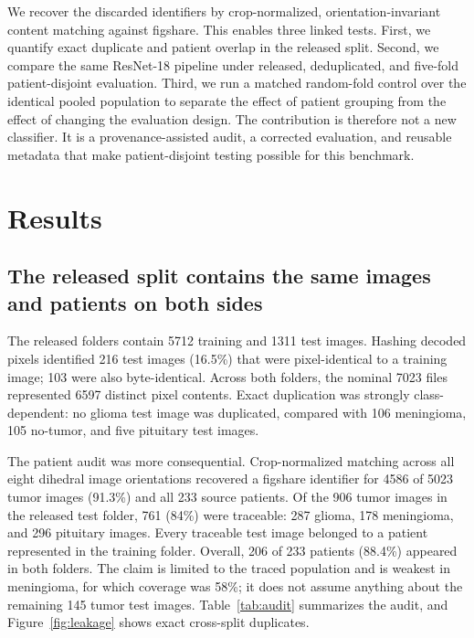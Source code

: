 ﻿\documentclass[twocolumn]{article}
\begin{document}
We recover the discarded identifiers by crop-normalized, orientation-invariant content matching against figshare. This enables three linked tests. First, we quantify exact duplicate and patient overlap in the released split. Second, we compare the same ResNet-18 pipeline under released, deduplicated, and five-fold patient-disjoint evaluation. Third, we run a matched random-fold control over the identical pooled population to separate the effect of patient grouping from the effect of changing the evaluation design. The contribution is therefore not a new classifier. It is a provenance-assisted audit, a corrected evaluation, and reusable metadata that make patient-disjoint testing possible for this benchmark.

\section{Results}
\subsection{The released split contains the same images and patients on both sides}
The released folders contain 5712 training and 1311 test images. Hashing decoded pixels identified 216 test images (16.5\%) that were pixel-identical to a training image; 103 were also byte-identical. Across both folders, the nominal 7023 files represented 6597 distinct pixel contents. Exact duplication was strongly class-dependent: no glioma test image was duplicated, compared with 106 meningioma, 105 no-tumor, and five pituitary test images.

The patient audit was more consequential. Crop-normalized matching across all eight dihedral image orientations recovered a figshare identifier for 4586 of 5023 tumor images (91.3\%) and all 233 source patients. Of the 906 tumor images in the released test folder, 761 (84\%) were traceable: 287 glioma, 178 meningioma, and 296 pituitary images. Every traceable test image belonged to a patient represented in the training folder. Overall, 206 of 233 patients (88.4\%) appeared in both folders. The claim is limited to the traced population and is weakest in meningioma, for which coverage was 58\%; it does not assume anything about the remaining 145 tumor test images. Table~\ref{tab:audit} summarizes the audit, and Figure~\ref{fig:leakage} shows exact cross-split duplicates.
\end{document}
